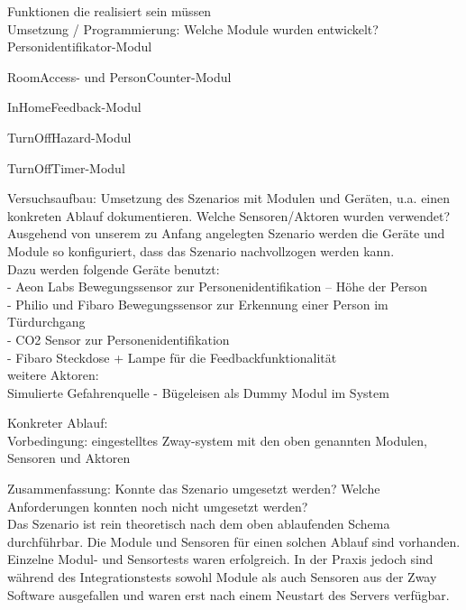 Funktionen die realisiert sein müssen\\

Umsetzung / Programmierung: Welche Module wurden entwickelt?\\

Personidentifikator-Modul

RoomAccess- und PersonCounter-Modul

InHomeFeedback-Modul



TurnOffHazard-Modul



TurnOffTimer-Modul



Versuchsaufbau: Umsetzung des Szenarios mit Modulen und Geräten, u.a. einen konkreten Ablauf dokumentieren. Welche Sensoren/Aktoren wurden verwendet?\\

Ausgehend von unserem zu Anfang angelegten Szenario werden die Geräte und Module so konfiguriert, dass das Szenario nachvollzogen werden kann.\\
Dazu werden folgende Geräte benutzt:\\
- Aeon Labs Bewegungssensor zur Personenidentifikation – Höhe der Person\\
- Philio und Fibaro Bewegungssensor zur Erkennung einer Person im Türdurchgang\\
- CO2 Sensor zur Personenidentifikation\\
- Fibaro Steckdose + Lampe für die Feedbackfunktionalität\\

weitere Aktoren:\\
Simulierte Gefahrenquelle - Bügeleisen als Dummy Modul im System

Konkreter Ablauf:\\

Vorbedingung: eingestelltes Zway-system mit den oben genannten Modulen, Sensoren und Aktoren


Zusammenfassung: Konnte das Szenario umgesetzt werden? Welche Anforderungen konnten noch nicht umgesetzt werden?\\

Das Szenario ist rein theoretisch nach dem oben ablaufenden Schema durchführbar. Die Module und Sensoren für einen solchen Ablauf sind vorhanden. Einzelne Modul- und Sensortests waren erfolgreich.
In der Praxis jedoch sind während des Integrationstests sowohl Module als auch Sensoren aus der Zway Software ausgefallen und waren erst nach einem Neustart des Servers verfügbar.

